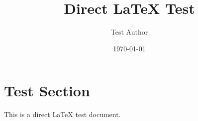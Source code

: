 \documentclass{article}
\title{Direct LaTeX Test}
\author{Test Author}
\date{\today}
\begin{document}
\maketitle

\section{Test Section}
This is a direct LaTeX test document.
\end{document}
